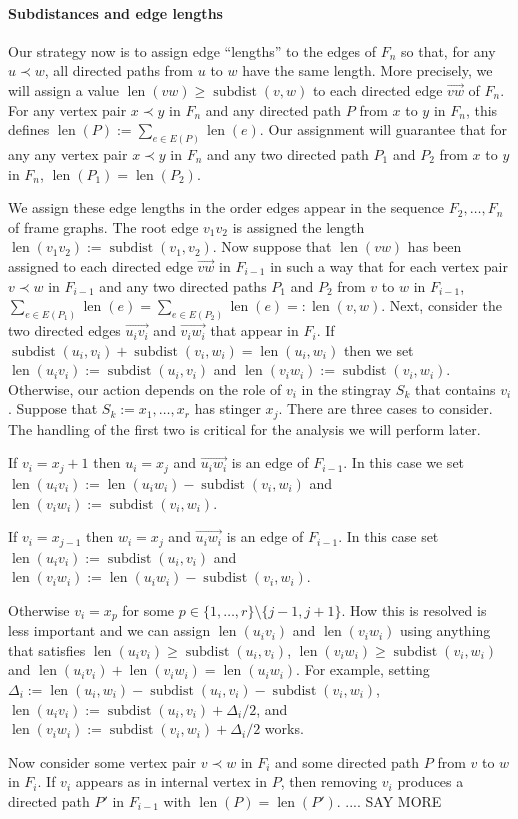 \documentclass{patmorin}
\DeclareMathOperator{\sd}{subdist}
\DeclareMathOperator{\len}{len}
\begin{document}
\paragraph{Subdistances and edge lengths}

Our strategy now is to assign edge ``lengths'' to the edges of $F_n$ so that, for any $u\prec w$, all directed paths from $u$ to $w$ have the same length.  More precisely, we will assign a value $\len(vw)\ge\sd(v,w)$ to each directed edge $\overrightarrow{vw}$ of $F_n$.  For any vertex pair $x\prec y$ in $F_n$ and any directed path $P$ from $x$ to $y$ in $F_n$, this defines $\len(P):=\sum_{e\in E(P)}\len(e)$.  Our assignment will guarantee that for any any vertex pair $x\prec y$ in $F_n$ and any two directed path $P_1$ and $P_2$ from $x$ to $y$ in $F_n$, $\len(P_1)=\len(P_2)$.

We assign these edge lengths in the order edges appear in the sequence $F_2,\ldots,F_n$ of frame graphs.  The root edge $v_1v_2$ is assigned the length $\len(v_1v_2):=\sd(v_1,v_2)$. Now suppose that $\len(vw)$ has been assigned to each directed edge $\overrightarrow{vw}$ in $F_{i-1}$ in such a way that for each vertex pair $v\prec w$ in $F_{i-1}$ and any two directed paths $P_1$ and $P_2$ from $v$ to $w$ in $F_{i-1}$, $\sum_{e\in E(P_1)}\len(e) = \sum_{e\in E(P_2)}\len(e)=:\len(v,w)$.  Next, consider the two directed edges $\overrightarrow{u_iv_i}$ and $\overrightarrow{v_iw_i}$ that appear in $F_i$. If $\sd(u_i,v_i)+\sd(v_i,w_i)=\len(u_i,w_i)$ then we set $\len(u_iv_i):=\sd(u_i,v_i)$ and $\len(v_iw_i):=\sd(v_i,w_i)$.  Otherwise, our action depends on the role of $v_i$ in the stingray $S_k$ that contains $v_i$.  Suppose that $S_k:=x_1,\ldots,x_r$ has stinger $x_j$.  There are three cases to consider.  The handling of the first two is critical for the analysis we will perform later.
\begin{compactenum}
  \item If $v_i=x_j+1$ then $u_i=x_j$ and $\overrightarrow{u_iw_i}$ is an edge of $F_{i-1}$.  In this case we set $\len(u_iv_i):=\len(u_iw_i)-\sd(v_i,w_i)$ and $\len(v_iw_i):=\sd(v_i,w_i)$.

  \item If $v_i=x_{j-1}$ then $w_i=x_j$ and $\overrightarrow{u_iw_i}$ is an edge of $F_{i-1}$.  In this case set $\len(u_iv_i):=\sd(u_i,v_i)$ and $\len(v_iw_i):=\len(u_iw_i)-\sd(v_i,w_i)$.

  \item Otherwise $v_i=x_p$ for some $p\in\{1,\ldots,r\}\setminus\{j-1,j+1\}$. How this is resolved is less important and we can assign $\len(u_iv_i)$ and $\len(v_iw_i)$ using anything that satisfies $\len(u_iv_i)\ge\sd(u_i,v_i)$, $\len(v_iw_i)\ge\sd(v_i,w_i)$ and $\len(u_iv_i)+\len(v_iw_i)=\len(u_iw_i)$.  For example, setting $\Delta_i:=\len(u_i,w_i)-\sd(u_i,v_i)-\sd(v_i,w_i)$,  $\len(u_iv_i):=\sd(u_i,v_i)+\Delta_i/2$, and $\len(v_iw_i):=\sd(v_i,w_i)+\Delta_i/2$ works.
\end{compactenum}
Now consider some vertex pair $v\prec w$ in $F_i$ and some directed path $P$ from $v$ to $w$ in $F_i$.  If $v_i$ appears as in internal vertex in $P$, then removing $v_i$ produces a directed path $P'$ in $F_{i-1}$ with $\len(P)=\len(P')$. .... SAY MORE
\end{document}
